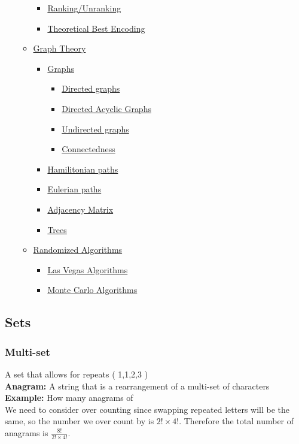 \documentclass{article}
\begin{document}
\begin{spacing}{1.5}
\begin{enumerate}
\begin{itemize}
\begin{itemize}
    \item  \hyperref[sec:ranking]{Ranking/Unranking}
    \item  \hyperref[sec:optimal]{Theoretical Best Encoding} 
\end{itemize}
\item \hyperref[sec:graphtheorry]{Graph Theory}
\begin{itemize}
    \item \hyperref[sec:graphs]{Graphs}
    \begin{itemize}
        \item \hyperref[sec:directed]{Directed graphs}
        \item \hyperref[sec:directedac]{Directed Acyclic Graphs}
        \item \hyperref[sec:undirected]{Undirected graphs}
        \item \hyperref[sec:connectedness] {Connectedness}
    \end{itemize}
    \item \hyperref[sec:hamilton]{Hamilitonian paths}
    \item \hyperref[sec:eulerian]{Eulerian paths}
    \item \hyperref[sec:adj]{Adjacency Matrix}
    \item \hyperref[sec:trees]{Trees}
\end{itemize}
\item \hyperref[sec:randalgo]{Randomized Algorithms}
\begin{itemize}
    \item \hyperref[sec:vegas]{Las Vegas Algorithms}
    \item \hyperref[sec:montecarlo]{Monte Carlo Algorithms}
\end{itemize}
\end{itemize}
\end{enumerate}
\newpage
\subsection{Sets}
\label{sec:sets}
%
\subsubsection{Multi-set}
\label{sec:multiset}
A set that allows for repeats ( {1,1,2,3} )\\
\textbf{Anagram:} A string that is a rearrangement of a multi-set of characters\\
\textbf{Example:} How many anagrams of \text{\color{red}{A}\color{green}{EE}\color{blue}{SSSS}\color{orange}{R}}\\
We need to consider over counting since swapping repeated letters will be the same, so the number we over count by is $2! \times 4!$. Therefore the total number of anagrams is $\frac{8!}{2! \times 4!}$.
%

\end{spacing}
\end{document}
